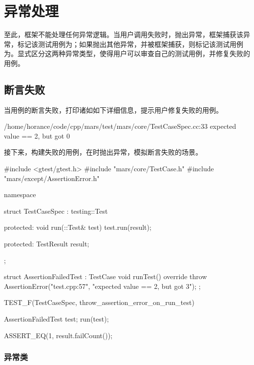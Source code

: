 \section{异常处理}

\begin{content}

至此，框架不能处理任何异常逻辑。当用户调用失败时，抛出异常，框架捕获该异常，标记该测试用例为；如果抛出其他异常，并被框架捕获，则标记该测试用例为。显式区分这两种异常类型，使得用户可以审查自己的测试用例，并修复失败的用例。

\subsection{断言失败}

当用例的断言失败，打印诸如如下详细信息，提示用户修复失败的用例。

\begin{leftbar}
 \begin{python}[caption={测试失败}]
/home/horance/code/cpp/mars/test/mars/core/TestCaseSpec.cc:33
expected value == 2, but got 0
 \end{python}
\end{leftbar}

接下来，构建失败的用例，在时抛出异常，模拟断言失败的场景。

\begin{leftbar}
 \begin{c++}[caption={\ttfamily{test/mars/TestCaseSpec.cc}}]
#include <gtest/gtest.h>
#include "mars/core/TestCase.h"
#include "mars/except/AssertionError.h"

namespace {
  struct TestCaseSpec : testing::Test {
  protected:
    void run(::Test& test) {
      test.run(result);
    }

  protected:
    TestResult result;
  };

  struct AssertionFailedTest : TestCase {
    void runTest() override {
      throw AssertionError("test.cpp:57", "expected value == 2, but got 3");
    }
  };
}

TEST_F(TestCaseSpec, throw_assertion_error_on_run_test) {
  AssertionFailedTest test;
  run(test);

  ASSERT_EQ(1, result.failCount());
}
 \end{c++}
\end{leftbar}

\subsubsection{异常类}


\end{content}
